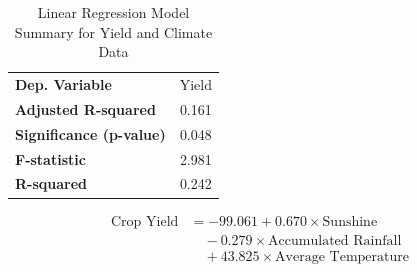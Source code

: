 \begin{table}[htbp]
    \centering
    \caption{Linear Regression Model Summary for Yield and Climate Data}
    \begin{tabular}{@{}lc@{}}
        \toprule
        \textbf{Dep. Variable} & Yield \\
        \textbf{Adjusted R-squared} & 0.161 \\
        \textbf{Significance (p-value)} & 0.048 \\
        \textbf{F-statistic} & 2.981 \\
        \textbf{R-squared} & 0.242 \\
        \bottomrule
    \end{tabular}
\end{table}

\begin{table}[htbp]
    \centering
    \caption{Regression Coefficients for Yield and Climate Data}
    \label{reg_coef_climate_yield}
\end{table}

\begin{equation}
    \begin{split}
        \text{Crop Yield} &= -99.061 + 0.670 \times \text{Sunshine} \\
        &\quad - 0.279 \times \text{Accumulated Rainfall} \\
        &\quad + 43.825 \times \text{Average Temperature}
    \end{split}
\end{equation}




